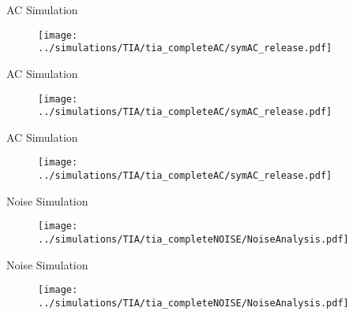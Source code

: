 \documentclass[t]{beamer}
\begin{document}
\begin{frame}[c,noframenumbering]{AC Simulation}
	\centering
	\begin{figure}
		\centering
		\texttt{[image: ../simulations/TIA/tia\_completeAC/symAC\_release.pdf]}
		\label{fig:tia:frequency:RF}
	\end{figure}\hfill
\end{frame}\begin{frame}[c,noframenumbering]{AC Simulation}
	\begin{figure}
		\centering
		\texttt{[image: ../simulations/TIA/tia\_completeAC/symAC\_release.pdf]}
		\label{fig:tia:frequency:CS}
	\end{figure}
\end{frame}

\begin{frame}[c,noframenumbering]{AC Simulation}
	\begin{figure}
		\centering
		\texttt{[image: ../simulations/TIA/tia\_completeAC/symAC\_release.pdf]}
		\label{fig:tia:frequency:CF}	
	\end{figure}
\end{frame}

\begin{frame}[c,noframenumbering]{Noise Simulation}
	\centering
	\begin{figure}
		\texttt{[image: ../simulations/TIA/tia\_completeNOISE/NoiseAnalysis.pdf]}
		\label{fig:tia:noise:RF}
	\end{figure}\hfill
\end{frame}

\begin{frame}[c,noframenumbering]{Noise Simulation}
	\begin{figure}
		\texttt{[image: ../simulations/TIA/tia\_completeNOISE/NoiseAnalysis.pdf]}
		\label{fig:tia:noise:CS}
	\end{figure}
\end{frame}
\end{document}
